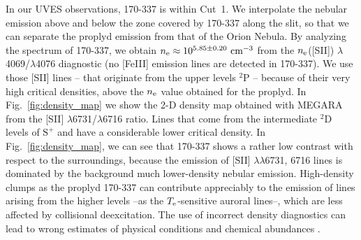 \documentclass[fleqn,usenatbib]{mnras}
\newcommand*\chem[1]{\ensuremath{\mathrm{#1}}}
\begin{document}
In our UVES observations, 170-337 is within Cut~1. We interpolate the nebular emission above and below the zone covered by 170-337 along the slit, so that we can separate the proplyd emission from that of the Orion Nebula. By analyzing the spectrum of 170-337, we obtain  $n_{\rm e}\approx 10^{5.85 \pm 0.20} \text{ cm}^{-3}$ from the $n_{\rm e}$([S\thinspace II]) $\lambda$4069/$\lambda$4076 diagnostic (no [Fe\thinspace III] emission lines are detected in 170-337). We use those [S\thinspace II] lines -- that originate from the upper levels \chem{^2P} -- because of their very high critical densities, above the $n_{\rm e}$ value obtained for the proplyd.
In Fig.~\ref{fig:density_map} we show the 2-D density map obtained with MEGARA from the [S\thinspace II] $\lambda$6731/$\lambda$6716 ratio. Lines that come from the intermediate \chem{^2D} levels of \chem{S^{+}} and have a considerable lower critical density. In Fig.~\ref{fig:density_map}, we can see that 170-337 shows a rather low contrast with respect to the surroundings, because the emission of [S\thinspace II] $\lambda\lambda$6731, 6716 lines is dominated by the background much lower-density nebular emission. High-density clumps as the proplyd 170-337 can contribute appreciably to the emission of lines arising from the higher levels --as the $T_{\rm e}$-sensitive auroral lines--, which are less affected by collisional deexcitation. The use of incorrect density diagnostics can lead to wrong estimates of physical conditions and chemical abundances \citep[][]{mendez2021-2}. 
\end{document}
